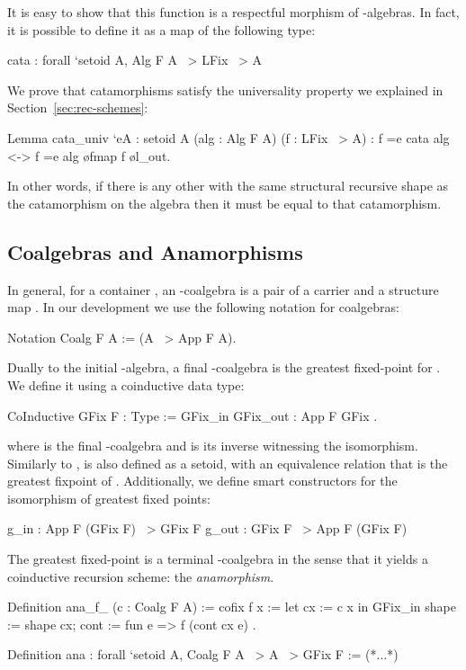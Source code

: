 \documentclass{llncs}
\begin{document}
It is easy to show that this function is a respectful morphism of
-algebras. In fact, it is possible to define it as a map of the
following type:
\begin{coqcode}
  cata : forall `{setoid A}, Alg F A ~> LFix ~> A
\end{coqcode}

\noindent
We prove that catamorphisms satisfy the universality property we explained in
Section~\ref{sec:rec-schemes}:
\begin{coqcode}
Lemma cata_univ `{eA : setoid A} (alg : Alg F A) (f : LFix ~> A)
    : f =e cata alg <-> f =e alg \o fmap f \o l_out.
\end{coqcode}

\noindent
In other words, if there is any other  with the same structural recursive
shape as the catamorphism on the algebra  then it must be equal to that
catamorphism.

\subsection{Coalgebras and Anamorphisms}
\label{sec:coalg}

In general, for a container , an -coalgebra is a pair of a carrier
 and a structure map .  In our development we use the
following notation for coalgebras:
\begin{coqcode}
Notation Coalg F A := (A ~> App F A).
\end{coqcode}

Dually to the initial -algebra, a final -coalgebra is the greatest
fixed-point for . We define it using a coinductive data type:
\begin{coqcode}
CoInductive GFix F : Type := GFix_in { GFix_out : App F GFix }.
\end{coqcode}

\noindent
where  is the final -coalgebra and  is its
inverse witnessing the isomorphism. Similarly to ,  is also
defined as a setoid, with an equivalence relation that is the greatest fixpoint
of . Additionally, we define smart constructors for the isomorphism of
greatest fixed points:
\begin{coqcode}
g_in : App F (GFix F) ~> GFix F          g_out : GFix F ~> App F (GFix F)
\end{coqcode}

The greatest fixed-point is a terminal -coalgebra in the sense that it
yields a coinductive recursion scheme: the \emph{anamorphism}.
\begin{coqcode}
Definition ana_f_ (c : Coalg F A) :=
  cofix f x :=
   let cx := c x in
   GFix_in { shape := shape cx; cont := fun e => f (cont cx e) }.

Definition ana : forall `{setoid A}, Coalg F A ~> A ~> GFix F := (*...*)
\end{coqcode}
\end{document}
